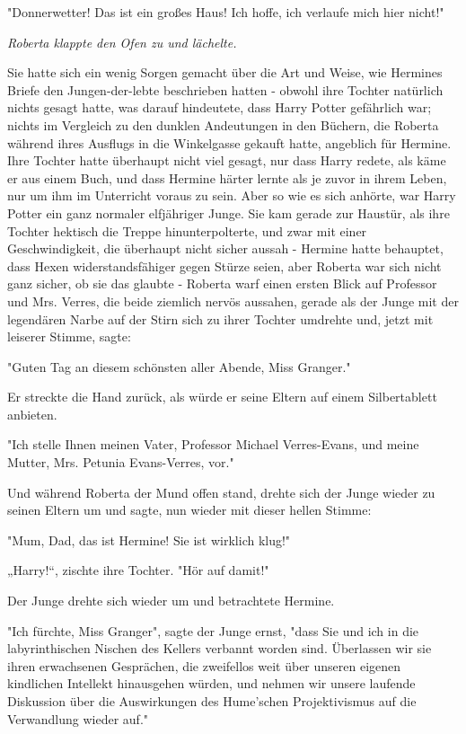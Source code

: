 {"Donnerwetter! Das ist ein großes Haus! Ich hoffe, ich verlaufe mich hier nicht!"

\emph{Roberta klappte den Ofen zu und lächelte.}

Sie hatte sich ein wenig Sorgen gemacht über die Art und Weise, wie Hermines Briefe den Jungen-der-lebte beschrieben hatten - obwohl ihre Tochter natürlich nichts gesagt hatte, was darauf hindeutete, dass Harry Potter gefährlich war; nichts im Vergleich zu den dunklen Andeutungen in den Büchern, die Roberta während ihres Ausflugs in die Winkelgasse gekauft hatte, angeblich für Hermine. Ihre Tochter hatte überhaupt nicht viel gesagt, nur dass Harry redete, als käme er aus einem Buch, und dass Hermine härter lernte als je zuvor in ihrem Leben, nur um ihm im Unterricht voraus zu sein. Aber so wie es sich anhörte, war Harry Potter ein ganz normaler elfjähriger Junge. Sie kam gerade zur Haustür, als ihre Tochter hektisch die Treppe hinunterpolterte, und zwar mit einer Geschwindigkeit, die überhaupt nicht sicher aussah - Hermine hatte behauptet, dass Hexen widerstandsfähiger gegen Stürze seien, aber Roberta war sich nicht ganz sicher, ob sie das glaubte - Roberta warf einen ersten Blick auf Professor und Mrs. Verres, die beide ziemlich nervös aussahen, gerade als der Junge mit der legendären Narbe auf der Stirn sich zu ihrer Tochter umdrehte und, jetzt mit leiserer Stimme, sagte:

"Guten Tag an diesem schönsten aller Abende, Miss Granger."

Er streckte die Hand zurück, als würde er seine Eltern auf einem Silbertablett anbieten.

"Ich stelle Ihnen meinen Vater, Professor Michael Verres-Evans, und meine Mutter, Mrs. Petunia Evans-Verres, vor."

Und während Roberta der Mund offen stand, drehte sich der Junge wieder zu seinen Eltern um und sagte, nun wieder mit dieser hellen Stimme:

"Mum, Dad, das ist Hermine! Sie ist wirklich klug!"

„Harry!“, zischte ihre Tochter. "Hör auf damit!"

Der Junge drehte sich wieder um und betrachtete Hermine.

"Ich fürchte, Miss Granger", sagte der Junge ernst, "dass Sie und ich in die labyrinthischen Nischen des Kellers verbannt worden sind. Überlassen wir sie ihren erwachsenen Gesprächen, die zweifellos weit über unseren eigenen kindlichen Intellekt hinausgehen würden, und nehmen wir unsere laufende Diskussion über die Auswirkungen des Hume'schen Projektivismus auf die Verwandlung wieder auf."

}
